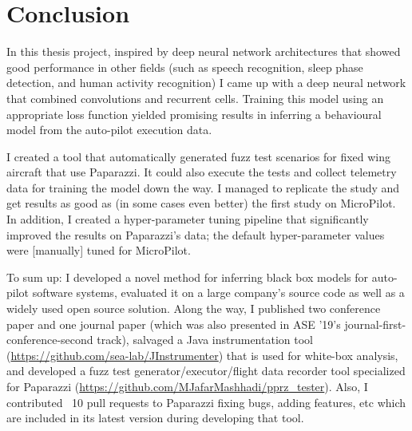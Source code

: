 \chapter{Conclusion} \label{sec:summary} %

In this thesis project, inspired by deep neural network architectures that showed good performance in other fields (such as speech recognition, sleep phase detection, and human activity recognition) I came up with a deep neural network that combined convolutions and recurrent cells. Training this model using an appropriate loss function yielded promising results in inferring a behavioural model from the auto-pilot execution data.

I created a tool that automatically generated fuzz test scenarios for fixed wing aircraft that use Paparazzi. It could also execute the tests and collect telemetry data for training the model down the way. 
I managed to replicate the study and get results as good as (in some cases even better) the first study on MicroPilot. In addition, I created a hyper-parameter tuning pipeline that significantly improved the results on Paparazzi's data; the default hyper-parameter values were [manually] tuned for MicroPilot.

To sum up: I developed a novel method for inferring black box models for auto-pilot software systems, evaluated it on a large company's source code as well as a widely used open source solution. Along the way, I published two conference paper and one journal paper (which was also presented in ASE '19's journal-first-conference-second track), salvaged a Java instrumentation tool (\url{https://github.com/sea-lab/JInstrumenter}) that is used for white-box analysis, and developed a fuzz test generator/executor/flight data recorder tool specialized for Paparazzi (\url{https://github.com/MJafarMashhadi/pprz_tester}). Also, I contributed ~10 pull requests to Paparazzi fixing bugs, adding features, etc which are included in its latest version during developing that tool.


